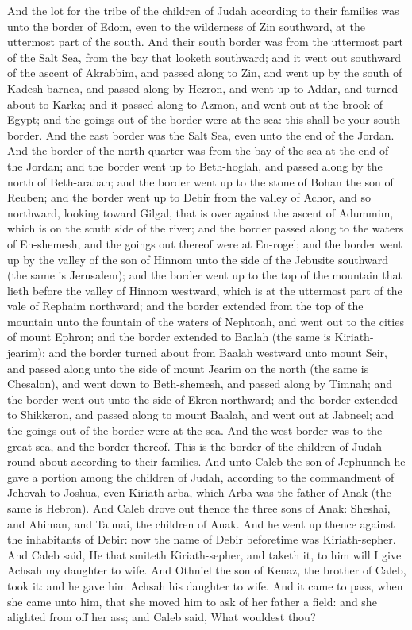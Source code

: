 And the lot for the tribe of the children of Judah according to their families was unto the border of Edom, even to the wilderness of Zin southward, at the uttermost part of the south. And their south border was from the uttermost part of the Salt Sea, from the bay that looketh southward; and it went out southward of the ascent of Akrabbim, and passed along to Zin, and went up by the south of Kadesh-barnea, and passed along by Hezron, and went up to Addar, and turned about to Karka; and it passed along to Azmon, and went out at the brook of Egypt; and the goings out of the border were at the sea: this shall be your south border. And the east border was the Salt Sea, even unto the end of the Jordan. And the border of the north quarter was from the bay of the sea at the end of the Jordan; and the border went up to Beth-hoglah, and passed along by the north of Beth-arabah; and the border went up to the stone of Bohan the son of Reuben; and the border went up to Debir from the valley of Achor, and so northward, looking toward Gilgal, that is over against the ascent of Adummim, which is on the south side of the river; and the border passed along to the waters of En-shemesh, and the goings out thereof were at En-rogel; and the border went up by the valley of the son of Hinnom unto the side of the Jebusite southward (the same is Jerusalem); and the border went up to the top of the mountain that lieth before the valley of Hinnom westward, which is at the uttermost part of the vale of Rephaim northward; and the border extended from the top of the mountain unto the fountain of the waters of Nephtoah, and went out to the cities of mount Ephron; and the border extended to Baalah (the same is Kiriath-jearim); and the border turned about from Baalah westward unto mount Seir, and passed along unto the side of mount Jearim on the north (the same is Chesalon), and went down to Beth-shemesh, and passed along by Timnah; and the border went out unto the side of Ekron northward; and the border extended to Shikkeron, and passed along to mount Baalah, and went out at Jabneel; and the goings out of the border were at the sea. And the west border was to the great sea, and the border thereof. This is the border of the children of Judah round about according to their families.  And unto Caleb the son of Jephunneh he gave a portion among the children of Judah, according to the commandment of Jehovah to Joshua, even Kiriath-arba, which Arba was the father of Anak (the same is Hebron). And Caleb drove out thence the three sons of Anak: Sheshai, and Ahiman, and Talmai, the children of Anak. And he went up thence against the inhabitants of Debir: now the name of Debir beforetime was Kiriath-sepher. And Caleb said, He that smiteth Kiriath-sepher, and taketh it, to him will I give Achsah my daughter to wife. And Othniel the son of Kenaz, the brother of Caleb, took it: and he gave him Achsah his daughter to wife. And it came to pass, when she came unto him, that she moved him to ask of her father a field: and she alighted from off her ass; and Caleb said, What wouldest thou? 